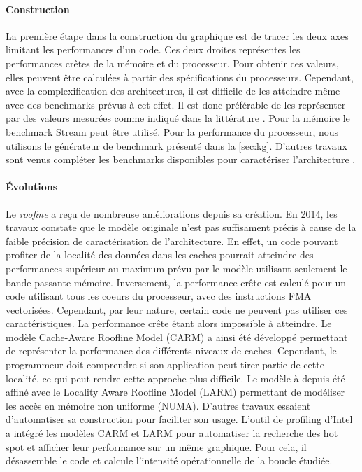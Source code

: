 \paragraph{Construction}
La première étape dans la construction du graphique est de tracer les deux axes limitant les performances d’un code. Ces deux droites représentes les performances crêtes de la mémoire et du processeur. Pour obtenir ces valeurs, elles peuvent être calculées à partir des spécifications du processeurs. Cependant, avec la complexification des architectures, il est difficile de les atteindre même avec des benchmarks prévus à cet effet. Il est donc préférable de les représenter par des valeurs mesurées comme indiqué dans la littérature  \cite{farjallah2014preparing}. Pour la mémoire le benchmark Stream peut être utilisé. Pour la performance du processeur, nous utilisons le générateur de benchmark présenté dans la \autoref{sec:kg}. D’autres travaux sont venus compléter les benchmarks disponibles pour caractériser l’architecture \cite{lo2014roofline}.




\paragraph{Évolutions}


Le \textit{roofine} a reçu de nombreuse améliorations depuis sa création. En 2014, les travaux \cite{Ilic2014} constate que le modèle originale n’est pas suffisament précis à cause de la faible précision de caractérisation de l’architecture. En effet, un code pouvant profiter de la localité des données dans les caches pourrait atteindre des performances supérieur au maximum prévu par le modèle utilisant seulement le bande passante mémoire. Inversement, la performance crête est calculé pour un code utilisant tous les coeurs du processeur, avec des instructions FMA vectorisées. Cependant, par leur nature, certain code ne peuvent pas utiliser ces  caractéristiques. La performance crête étant alors impossible à atteindre. Le modèle Cache-Aware Roofline Model (CARM) \cite{Ilic2014} a ainsi été développé permettant de représenter la performance des différents niveaux de caches. Cependant, le programmeur doit comprendre si son application peut tirer partie de cette localité, ce qui peut rendre cette approche plus difficile. Le modèle à depuis été affiné avec le Locality Aware Roofline Model (LARM) \cite{Denoyelle2018} permettant de modéliser les accès en mémoire non uniforme (NUMA).
D’autres travaux essaient d’automatiser sa construction \cite{lo2014roofline} pour faciliter son usage. L’outil de profiling d’Intel a intégré les modèles CARM et LARM pour automatiser la recherche des hot spot et afficher leur performance sur un même graphique. Pour cela, il désassemble le code et calcule l’intensité opérationnelle de la boucle étudiée.


